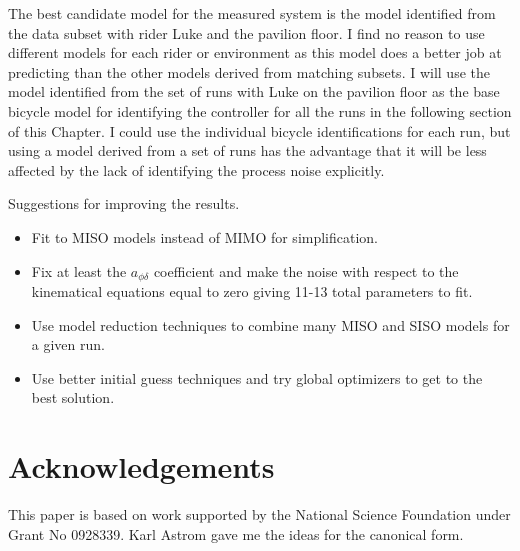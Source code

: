 \documentclass[a4paper]{article}
\begin{document}
The best candidate model for the measured system is the model identified
from the data subset with rider Luke and the pavilion floor. I find no
reason to use different models for each rider or environment as this
model does a better job at predicting than the other models derived from
matching subsets. I will use the model identified from the set of runs
with Luke on the pavilion floor as the base bicycle model for
identifying the controller for all the runs in the following section of
this Chapter. I could use the individual bicycle identifications for
each run, but using a model derived from a set of runs has the advantage
that it will be less affected by the lack of identifying the process
noise explicitly.

Suggestions for improving the results.

\begin{itemize}
  \item
    Fit to MISO models instead of MIMO for simplification.
  \item
    Fix at least the $a_{\phi\delta}$ coefficient and make the noise with
    respect to the kinematical equations equal to zero giving 11-13 total
    parameters to fit.
  \item
    Use model reduction techniques to combine many MISO and SISO models
    for a given run.
  \item
    Use better initial guess techniques and try global optimizers to get
    to the best solution.
\end{itemize}

\section*{Acknowledgements}

This paper is based on work supported by the National Science Foundation under
Grant No 0928339. Karl Astrom gave me the ideas for the canonical form.




\end{document}
